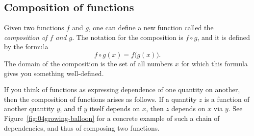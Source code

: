 \subsection{Composition of functions}
Given two functions $f$ and $g$, one can define a new function called
the \emph{composition of $f$ and $g$}.  The notation for the
composition is $f\circ g$, and it is defined by the formula
\[
f\circ g(x)  = f\bigl(g(x)\bigr).
\]
The domain of the composition is the set of all numbers $x$ for which
this formula gives you something well-defined.

If you think of functions as expressing dependence of one quantity on another,
then the composition of functions arises as follows.  If a quantity $z$ is a
function of another quantity $y$, and if $y$ itself depends on $x$, then $z$
depends on $x$ via $y$.  See Figure~\ref{fig:04growing-balloon} for a concrete
example of such a chain of dependencies, and thus of composing two functions.



